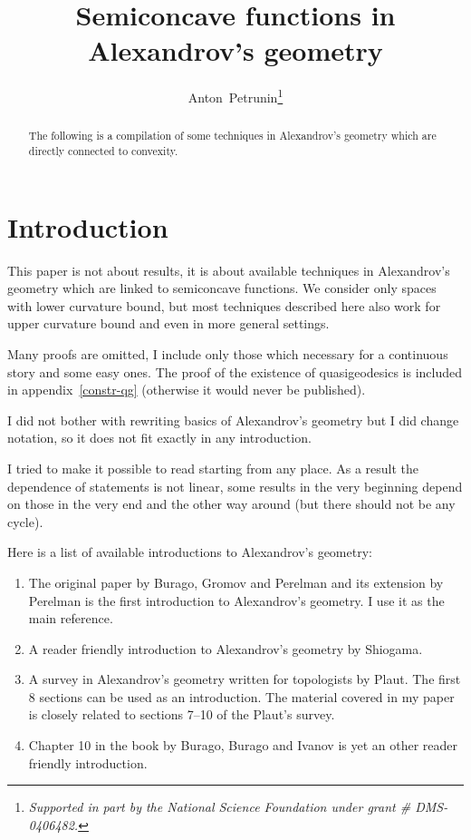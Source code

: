 \documentclass{article}
\begin{document}
\title{Semiconcave functions in Alexandrov's geometry}

\author{Anton~Petrunin\footnote{\it Supported in part by the National Science Foundation under grant \# DMS-0406482.
}}
\date{}


\maketitle

\begin{abstract}
The following is a compilation of some techniques in Alexandrov's geometry which are directly connected to convexity.
\end{abstract}


\renewcommand{\thefootnote}{}

\renewcommand{\thefootnote}{\arabic{footnote}}


\section*{Introduction}

This paper is not about results, it is about available techniques in Alexandrov's geometry which are linked to semiconcave functions.  
We consider only spaces with lower curvature bound, but
most techniques described here also work for upper curvature bound and even in more general settings. 

Many proofs are omitted, I include only those which necessary for a continuous story and some easy ones.
The proof of the existence of quasigeodesics is included in appendix~\ref{constr-qg} (otherwise it would never be published).

I did not bother with rewriting basics of Alexandrov's geometry but I did change notation, so it does not fit exactly in any introduction.
  
I tried to make it possible to read starting from any place. 
As a result the dependence of statements is not linear, some results in the very beginning depend on those in the very end and the other way around (but there should not be any cycle).

Here is a list of available introductions to Alexandrov's geometry: 
\begin{enumerate}[$\diamond$]
\item The original paper \cite{BGP}
by Burago, Gromov and Perelman 
and its extension
\cite{perelman:spaces2} by Perelman 
is the first introduction to Alexandrov's geometry. 
I use it as the main reference.

\item  A reader friendly introduction to Alexandrov's geometry \cite{shiohama} by Shiogama. 

\item A survey in Alexandrov's geometry \cite{plaut:survey}
written for topologists by Plaut. 
The first 8 sections can be used as an introduction. 
The material covered in my paper is closely related to sections 7--10 of the   Plaut's survey.

\item Chapter 10 in the book \cite{BBI} by Burago, Burago and Ivanov is yet an other reader friendly introduction.
\end{enumerate}
\end{document}
